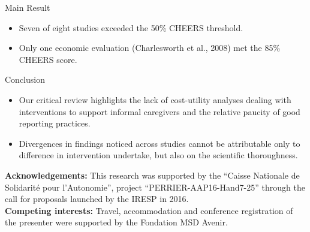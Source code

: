 \documentclass[final]{beamer}
\newlength{\onecolwid}
\begin{document}
\begin{frame}[t]
\begin{columns}[t]
\begin{column}{\onecolwid}
\begin{alertblock}{Main Result}
\begin{itemize}
\item \justifying Seven of eight studies exceeded the 50\% CHEERS threshold.
\item Only one economic evaluation (Charlesworth et al., 2008) met the 85\% CHEERS score.
\end{itemize}

\end{alertblock} 
\vspace{-1.0cm}
\begin{block}{Conclusion}
\vspace{-0.5cm}
\begin{itemize}
    \item \justifying Our critical review highlights the lack of cost-utility analyses dealing with interventions to support informal caregivers and the relative paucity of good reporting practices. 
    \item Divergences in findings noticed across studies cannot be attributable only to difference in intervention undertake, but also on the scientific thoroughness.
   \end{itemize}
\end{block}


\vspace{-1.0cm}
\scriptsize \justifying \textbf{Acknowledgements:} This research was supported by the “Caisse Nationale de Solidarité pour l'Autonomie”, project “PERRIER-AAP16-Hand7-25” through the call for proposals launched by the IRESP in 2016.\\
\scriptsize \justifying \textbf{Competing interests:} Travel, accommodation and conference registration of the presenter were supported by the Fondation MSD Avenir.



\end{column}
\end{columns}
\end{frame}
\end{document}
